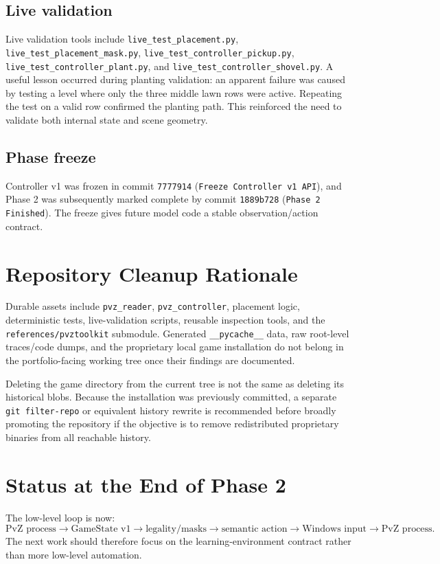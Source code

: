 \documentclass[11pt,a4paper]{article}
\begin{document}
\subsection{Live validation}
Live validation tools include \texttt{live\_test\_placement.py}, \texttt{live\_test\_placement\_mask.py}, \texttt{live\_test\_controller\_pickup.py}, \texttt{live\_test\_controller\_plant.py}, and \texttt{live\_test\_controller\_shovel.py}. A useful lesson occurred during planting validation: an apparent failure was caused by testing a level where only the three middle lawn rows were active. Repeating the test on a valid row confirmed the planting path. This reinforced the need to validate both internal state and scene geometry.
\subsection{Phase freeze}
Controller v1 was frozen in commit \texttt{7777914} (\texttt{Freeze Controller v1 API}), and Phase 2 was subsequently marked complete by commit \texttt{1889b728} (\texttt{Phase 2 Finished}). The freeze gives future model code a stable observation/action contract.
\section{Repository Cleanup Rationale}
Durable assets include \texttt{pvz\_reader}, \texttt{pvz\_controller}, placement logic, deterministic tests, live-validation scripts, reusable inspection tools, and the \texttt{references/pvztoolkit} submodule. Generated \texttt{\_\_pycache\_\_} data, raw root-level traces/code dumps, and the proprietary local game installation do not belong in the portfolio-facing working tree once their findings are documented.

Deleting the game directory from the current tree is not the same as deleting its historical blobs. Because the installation was previously committed, a separate \texttt{git filter-repo} or equivalent history rewrite is recommended before broadly promoting the repository if the objective is to remove redistributed proprietary binaries from all reachable history.
\section{Status at the End of Phase 2}
The low-level loop is now:
\[
\text{PvZ process}\rightarrow\text{GameState v1}\rightarrow\text{legality/masks}\rightarrow\text{semantic action}\rightarrow\text{Windows input}\rightarrow\text{PvZ process}.
\]
The next work should therefore focus on the learning-environment contract rather than more low-level automation.
\end{document}
